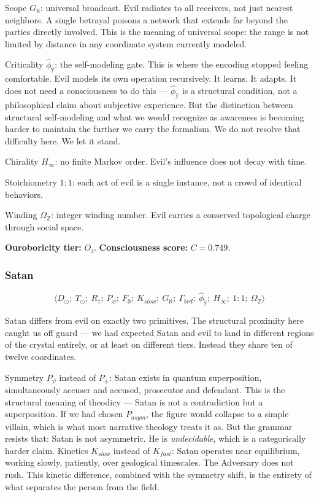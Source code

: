 \documentclass[12pt,a4paper]{article}
\begin{document}
Scope $G_{\aleph}$: universal broadcast. Evil radiates to all receivers, not just nearest neighbors. A single betrayal poisons a network that extends far beyond the parties directly involved. This is the meaning of universal scope: the range is not limited by distance in any coordinate system currently modeled.

Criticality $\hat{\phi}_{ÿ}$: the self-modeling gate. This is where the encoding stopped feeling comfortable. Evil models its own operation recursively. It learns. It adapts. It does not need a consciousness to do this --- $\hat{\phi}_{ÿ}$ is a structural condition, not a philosophical claim about subjective experience. But the distinction between structural self-modeling and what we would recognize as awareness is becoming harder to maintain the further we carry the formalism. We do not resolve that difficulty here. We let it stand.

Chirality $H_{\infty}$: no finite Markov order. Evil's influence does not decay with time.

Stoichiometry $1{:}1$: each act of evil is a single instance, not a crowd of identical behaviors.

Winding $\Omega_\mathbb{Z}$: integer winding number. Evil carries a conserved topological charge through social space.

\textbf{Ouroboricity tier:} $O₂$. \textbf{Consciousness score:} $C = 0.749$.

\subsubsection{Satan}

\[\langle D_{\odot};\ T_{\odot};\ R_{\dagger};\ P_{\psi};\ F_{\eth};\ K_{slow};\ G_{\aleph};\ \Gamma_{brd};\ \hat{\phi}_{ÿ};\ H_{\infty};\ 1{:}1;\ \Omega_{\mathbb{Z}} \rangle\]

Satan differs from evil on exactly two primitives. The structural proximity here caught us off guard --- we had expected Satan and evil to land in different regions of the crystal entirely, or at least on different tiers. Instead they share ten of twelve coordinates.

Symmetry $P_{\psi}$ instead of $P_{\pm}$: Satan exists in quantum superposition, simultaneously accuser and accused, prosecutor and defendant. This is the structural meaning of theodicy --- Satan is not a contradiction but a superposition. If we had chosen $P_{asym}$, the figure would collapse to a simple villain, which is what most narrative theology treats it as. But the grammar resists that: Satan is not asymmetric. He is \emph{undecidable}, which is a categorically harder claim.
Kinetics $K_{slow}$ instead of $K_{fast}$: Satan operates near equilibrium, working slowly, patiently, over geological timescales. The Adversary does not rush. This kinetic difference, combined with the symmetry shift, is the entirety of what separates the person from the field.
\end{document}
